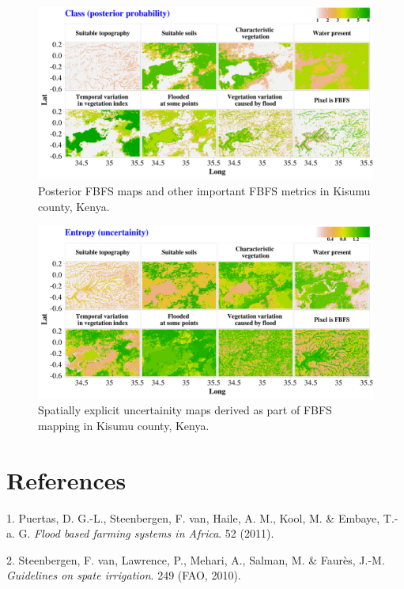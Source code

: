 \documentclass[12pt,oneside]{article}
\begin{document}
\begin{figure}
\includegraphics[width=1\linewidth]{figures/Mapping_FBFS_posterior_maps} \caption{Posterior FBFS maps and other important FBFS metrics in Kisumu county, Kenya.}\label{fig:fig12}
\end{figure}

\begin{figure}
\includegraphics[width=1\linewidth]{figures/Mapping_FBFS_uncertainity_maps} \caption{Spatially explicit uncertainity maps derived as part of FBFS mapping in Kisumu county, Kenya.}\label{fig:fig13}
\end{figure}

\hypertarget{references}{%
\section*{References}\label{references}}

\hypertarget{refs}{}
\leavevmode\hypertarget{ref-Puertas_et_al_2011}{}%
1. Puertas, D. G.-L., Steenbergen, F. van, Haile, A. M., Kool, M. \& Embaye, T.-a. G. \emph{Flood based farming systems in Africa}. 52 (2011).

\leavevmode\hypertarget{ref-VanSteenbergen_et_al_2010}{}%
2. Steenbergen, F. van, Lawrence, P., Mehari, A., Salman, M. \& Faurès, J.-M. \emph{Guidelines on spate irrigation}. 249 (FAO, 2010).
\end{document}

